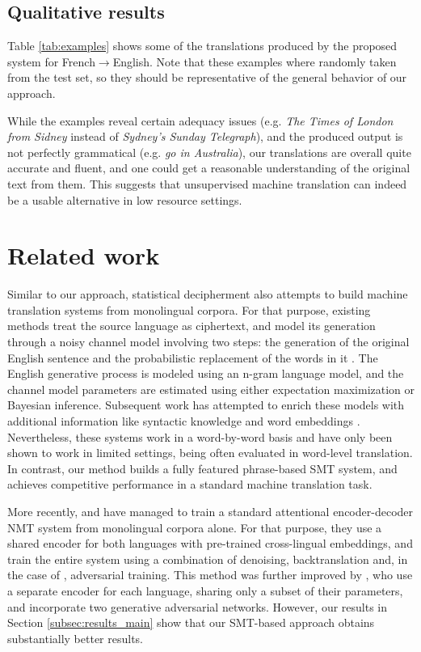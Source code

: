 \documentclass[11pt,a4paper]{article}
\begin{document}
\subsection{Qualitative results} \label{subsec:results_examples}

Table \ref{tab:examples} shows some of the translations produced by the proposed system for French$
\rightarrow$English. Note that these examples where randomly taken from the test set, so they should be representative of the general behavior of our approach.

While the examples reveal certain adequacy issues (e.g. \textit{The Times of London from Sidney} instead of \textit{Sydney's Sunday Telegraph}), and the produced output is not perfectly grammatical (e.g. \textit{go in Australia}), our translations are overall quite accurate and fluent, and one could get a reasonable understanding of the original text from them. This suggests that unsupervised machine translation can indeed be a usable alternative in low resource settings.


\section{Related work} \label{sec:related_work}

Similar to our approach, statistical decipherment also attempts to build machine translation systems from monolingual corpora. For that purpose, existing methods treat the source language as ciphertext, and model its generation through a noisy channel model involving two steps: the generation of the original English sentence and the probabilistic replacement of the words in it \citep{ravi2011deciphering,dou2012large}. The English generative process is modeled using an n-gram language model, and the channel model parameters are estimated using either expectation maximization or Bayesian inference. Subsequent work has attempted to enrich these models with additional information like syntactic knowledge \citep{dou2013dependency} and word embeddings \citep{dou2015unifying}. Nevertheless, these systems work in a word-by-word basis and have only been shown to work in limited settings, being often evaluated in word-level translation. In contrast, our method builds a fully featured phrase-based SMT system, and achieves competitive performance in a standard machine translation task.

More recently, \citet{artetxe2018unsupervised} and \citet{lample2018unsupervised} have managed to train a standard attentional encoder-decoder NMT system from monolingual corpora alone. For that purpose, they use a shared encoder for both languages with pre-trained cross-lingual embeddings, and train the entire system using a combination of denoising, backtranslation and, in the case of \citet{lample2018unsupervised}, adversarial training. This method was further improved by \citet{yang2018unsupervised},
who use a separate encoder for each language, sharing only a subset of their parameters, and incorporate two generative adversarial networks. However, our results in Section \ref{subsec:results_main} show that our SMT-based approach obtains substantially better results.
\end{document}
